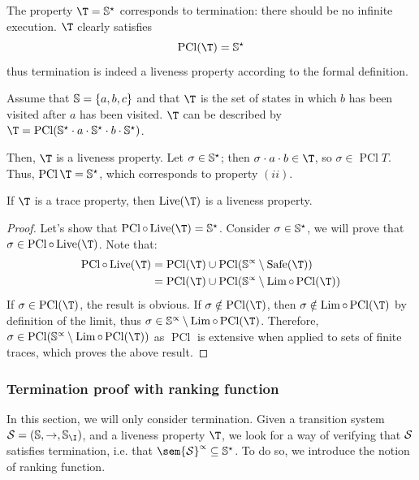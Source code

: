 \documentclass[toc, titlepaged]{../cs-classes/cs-classes}
\DeclareMathOperator{\pcl}{PCl}
\DeclareMathOperator{\Lim}{Lim}
\DeclareMathOperator{\safe}{Safe}
\DeclareMathOperator{\live}{Live}
\begin{document}
\begin{example}[Termination]
    The property $\T = \S^\star$ corresponds to termination: there should be no infinite execution. $\T$ clearly satisfies
    \begin{equation*}
        \pcl(\T) = \S^\star
    \end{equation*}
    thus termination is indeed a liveness property according to the formal definition.
\end{example}

\begin{example}
    Assume that $\S = \{a, b, c\}$ and that $\T$ is the set of states in which $b$ has been visited after $a$ has been visited. $\T$ can be described by $\T = \pcl(\S^\star \cdot a \cdot \S^\star \cdot b \cdot \S^\star)$. 

    Then, $\T$ is a liveness property. Let $\sigma\in\S^\star$; then $\sigma\cdot a\cdot b \in \T$, so $\sigma\in\pcl{T}$. Thus, $\pcl{\T} = \S^\star$, which corresponds to property $(ii)$.
\end{example}

\begin{theorem}[$\live$ is idempotent]
    If $\T$ is a trace property, then $\live(\T)$ is a liveness property.
\end{theorem}
\begin{proof}
    Let's show that $\pcl\circ\live(\T)=\S^\star$. Consider $\sigma\in\S^\star$, we will prove that $\sigma\in\pcl\circ\live(\T)$. Note that:
    \begin{equation*}
        \begin{aligned}
            \pcl\circ\live(\T) &= \pcl(\T)\cup\pcl(\S^\propto\setminus\safe(\T)) \\
            &= \pcl(\T)\cup\pcl(\S^\propto\setminus\Lim\circ\pcl(\T))
        \end{aligned}
    \end{equation*}
    If $\sigma\in\pcl(\T)$, the result is obvious. If $\sigma\notin\pcl(\T)$, then $\sigma\notin\Lim\circ\pcl(\T)$ by definition of the limit, thus $\sigma\in\S^\propto\setminus\Lim\circ\pcl(\T)$. Therefore, $\sigma\in\pcl(\S^\propto\setminus\Lim\circ\pcl(\T))$ as $\pcl$ is extensive when applied to sets of finite traces, which proves the above result.
\end{proof}

\subsubsection{Termination proof with ranking function}
In this section, we will only consider termination. Given a transition system $\Sc=(\S, \to, \S_{\I})$, and a liveness property $\T$, we look for a way of verifying that $\Sc$ satisfies termination, i.e. that $\sem{\Sc}^\propto\subseteq\S^\star$. To do so, we introduce the notion of ranking function.
\end{document}

